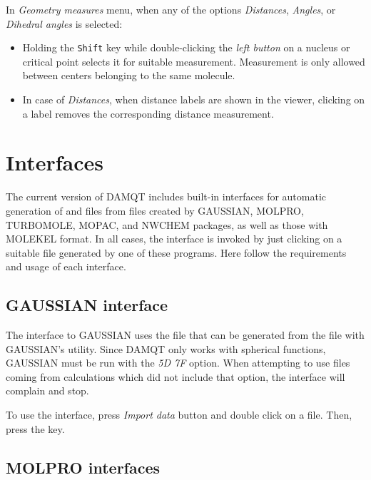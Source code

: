 \documentclass[10pt]{article}
\begin{document}
In {\it Geometry measures} menu, when any of the options 
{\it Distances}, {\it Angles}, or {\it Dihedral angles} 
is selected:

\begin{itemize}
\item Holding the \texttt{Shift} key while double-clicking the {\it left button}
 on a 
nucleus or critical point selects it for suitable measurement. 
Measurement is only allowed between centers belonging to the same molecule.

\item In case of {\it Distances}, when distance labels are shown in the viewer,
clicking on a label removes the corresponding distance measurement.
\end{itemize}

\section{Interfaces \label{sec:Interfaces}}

The current version of DAMQT includes built-in interfaces for automatic
generation of \den{ } and \ggbs{ } files from files created by
GAUSSIAN, MOLPRO, TURBOMOLE, MOPAC, and NWCHEM packages, as well as those with MOLEKEL format. 
In all cases, the
interface is invoked by just clicking on a suitable file generated by one of
these programs. Here follow the requirements and usage of each interface.


\subsection{GAUSSIAN interface \label{sec:5.1}}

The interface to GAUSSIAN uses the \fchk{ } file that can be generated from 
the \chk{ } file with GAUSSIAN's \formchk{ } utility.
Since DAMQT only works with spherical functions, GAUSSIAN must be run with
the {\it 5D 7F} option. When attempting to use files coming from calculations
which did not include that option, the interface will complain and stop.

To use the interface, press {\it Import data} button \teclapuntos and double click
on a \fchk{ } file. Then, press the \exec key.


\subsection{MOLPRO interfaces \label{sec:5.2}}
\end{document}
